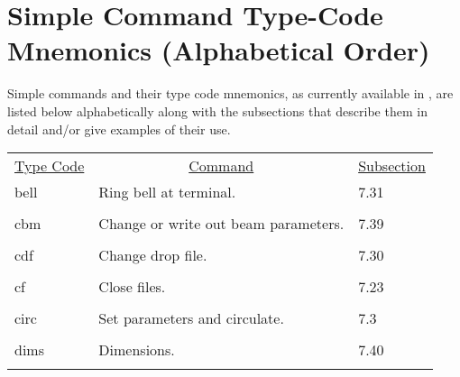 \newpage
\section[Simple Command Type-Code $\cdots$ (Alphabetical Order)]{Simple Command Type-Code Mnemonics \protect\newline (Alphabetical Order)}
     Simple commands and their type code mnemonics, as currently available
in , are listed below alphabetically along with the subsections
that describe them in detail and/or give examples of their use.
\begin{center}
\begin{tabular}{lll}
\multicolumn{1}{c}{\underline {Type Code}} &
\multicolumn{1}{c}{\underline{Command}}   &
\multicolumn{1}{c}{\underline{Subsection}} \\
\hspace{1.5em}bell  &         Ring bell at terminal.               & \hspace{2em}7.31\\
\vspace{-3mm}& &\\
\hspace{1.5em}cbm  &     Change or write out beam parameters.      & \hspace{2em}7.39\\
\vspace{-3mm}& &\\
\hspace{1.5em}cdf   &        Change drop file.                     & \hspace{2em}7.30\\
\vspace{-3mm}& &\\
\hspace{1.5em}cf    &        Close files.                          & \hspace{2em}7.23\\
\vspace{-3mm}& &\\
\hspace{1.5em}circ  &         Set parameters and circulate.        & \hspace{2em}7.3\\
\vspace{-3mm}& &\\
\hspace{1.5em}dims  &  Dimensions.  &   \hspace{2em}7.40\\
\vspace{-3mm}& &\\

\end{tabular}
\end{center}
